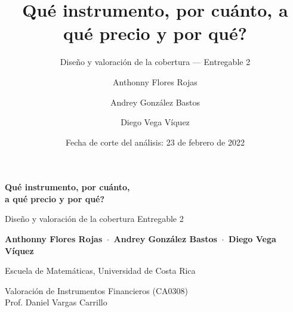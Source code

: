 \documentclass[aspectratio=169,11pt]{beamer}
\title{\textquestiondown Qué instrumento, por cuánto, a qué precio y por qué?}
\subtitle{Diseño y valoración de la cobertura — Entregable 2}
\author{Anthonny Flores Rojas \and Andrey González Bastos \and Diego Vega Víquez}
\institute{Escuela de Matemáticas, Universidad de Costa Rica\\
  Valoración de Instrumentos Financieros (CA0308) — Prof. Daniel Vargas Carrillo}
\date{Fecha de corte del análisis: 23 de febrero de 2022}
\begin{document}

\begin{frame}[plain]
  \vspace{1mm}
  \vspace{-2mm}
  {\color{white}\fontsize{19}{22}\selectfont\bfseries \textquestiondown Qué instrumento, por cuánto,\\ a qué precio y por qué?\par}
  \vspace{1.5mm}
  {\color{white!85!cezblue}\small Diseño y valoración de la cobertura \hfill Entregable 2\par}
  \vspace{18mm}
  {\small\bfseries Anthonny Flores Rojas \,$\cdot$\, Andrey González Bastos \,$\cdot$\, Diego Vega Víquez\par}
  \vspace{2mm}
  {\footnotesize Escuela de Matemáticas, Universidad de Costa Rica\par
   Valoración de Instrumentos Financieros (CA0308) \\ Prof. Daniel Vargas Carrillo\par}
   \vspace{2cm}
\end{frame}
\end{document}
